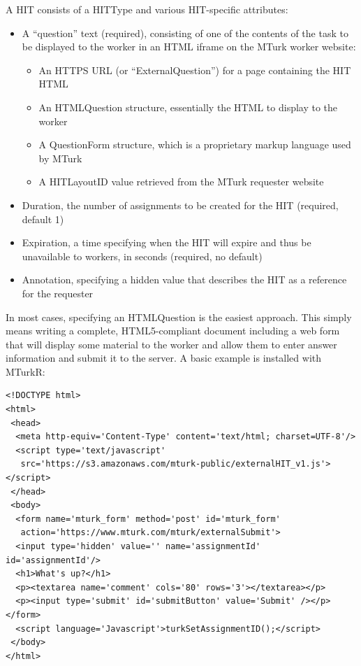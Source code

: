 A HIT consists of a HITType and various HIT-specific attributes:

\begin{itemize}
\item A ``question'' text (required), consisting of one of the contents of the task to be displayed to the worker in an HTML iframe on the MTurk worker website:
	\begin{itemize}
		\item An HTTPS URL (or ``ExternalQuestion'') for a page containing the HIT HTML
		\item An HTMLQuestion structure, essentially the HTML to display to the worker
		\item A QuestionForm structure, which is a proprietary markup language used by MTurk
		\item A HITLayoutID value retrieved from the MTurk requester website
	\end{itemize}
\item Duration, the number of assignments to be created for the HIT (required, default 1)
\item Expiration, a time specifying when the HIT will expire and thus be unavailable to workers, in seconds (required, no default)
\item Annotation, specifying a hidden value that describes the HIT as a reference for the requester
\end{itemize}

In most cases, specifying an HTMLQuestion is the easiest approach. This simply means writing a complete, HTML5-compliant document including a web form that will display some material to the worker and allow them to enter answer information and submit it to the server. A basic example is installed with MTurkR:

\begin{verbatim}
<!DOCTYPE html>
<html>
 <head>
  <meta http-equiv='Content-Type' content='text/html; charset=UTF-8'/>
  <script type='text/javascript' 
   src='https://s3.amazonaws.com/mturk-public/externalHIT_v1.js'></script>
 </head>
 <body>
  <form name='mturk_form' method='post' id='mturk_form' 
   action='https://www.mturk.com/mturk/externalSubmit'>
  <input type='hidden' value='' name='assignmentId' id='assignmentId'/>
  <h1>What's up?</h1>
  <p><textarea name='comment' cols='80' rows='3'></textarea></p>
  <p><input type='submit' id='submitButton' value='Submit' /></p></form>
  <script language='Javascript'>turkSetAssignmentID();</script>
 </body>
</html>
\end{verbatim}

